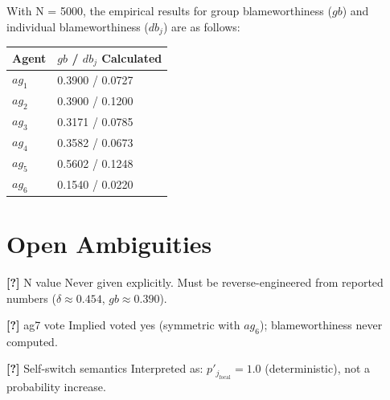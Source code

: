 \documentclass[10pt,a4paper]{article}
\newcommand{\AMB}[1]{\textcolor{ambcol}{\textbf{[?]}\; #1}}
\begin{document}
With N = 5000, the empirical results for group blameworthiness ($gb$) and individual blameworthiness ($db_j$) are as follows:

\begin{tabular}{@{}ll@{}}
\toprule
Agent & $gb$ / $db_j$ Calculated \\
\midrule
$ag_1$ & 0.3900 / 0.0727 \\
$ag_2$ & 0.3900 / 0.1200 \\
$ag_3$ & 0.3171 / 0.0785 \\
$ag_4$ & 0.3582 / 0.0673 \\
$ag_5$ & 0.5602 / 0.1248 \\
$ag_6$ & 0.1540 / 0.0220 \\
\bottomrule
\end{tabular}

\section*{Open Ambiguities}

\AMB{N value} Never given explicitly. Must be reverse-engineered from reported numbers ($\delta \approx 0.454$, $gb \approx 0.390$).

\AMB{ag7 vote} Implied voted yes (symmetric with $ag_6$); blameworthiness never computed.

\AMB{Self-switch semantics} Interpreted as: $p'_{j_{\text{focal}}} = 1.0$ (deterministic), not a probability increase.
\end{document}
